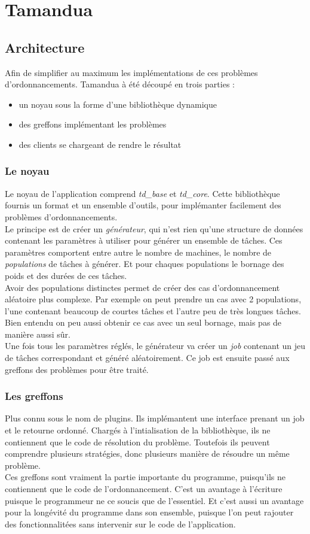 \chapter{Tamandua}
\section{Architecture}
Afin de simplifier au maximum les implémentations de ces problèmes 
d'ordonnancements. Tamandua à été découpé en trois parties :
\begin{itemize}
   \item un noyau sous la forme d'une bibliothèque dynamique
   \item des greffons implémentant les problèmes
   \item des clients se chargeant de rendre le résultat
\end{itemize}

\subsection{Le noyau}
Le noyau de l'application comprend {\em td\_base} et {\em td\_core}. Cette
bibliothèque fournis un format et un ensemble d'outils, pour implémanter
facilement des problèmes d'ordonnancements. \\
Le principe est de créer un {\em générateur}, qui n'est rien qu'une structure de
données contenant les paramètres à utiliser pour générer un ensemble de tâches.
Ces paramètres comportent entre autre le nombre de machines, le nombre de
{\em populations} de tâches à générer. Et pour chaques populations le bornage 
des poids et des durées de ces tâches.\\
Avoir des populations distinctes permet de créer des cas d'ordonnancement
aléatoire plus complexe. Par exemple on peut prendre un cas avec 2 populations, 
l'une contenant beaucoup de courtes tâches et l'autre peu de très longues 
tâches. Bien entendu on peu aussi obtenir ce cas avec un seul bornage, mais pas 
de manière aussi sûr.\\
Une fois tous les paramètres réglés, le générateur va créer un {\em job}
contenant un jeu de tâches correspondant et généré aléatoirement. Ce job est
ensuite passé aux greffons des problèmes pour être traité.

\subsection{Les greffons}
Plus connu sous le nom de plugins. Ils implémantent une interface prenant un job
et le retourne ordonné. Chargés à l'intialisation de la bibliothèque, ils
ne contiennent que le code de résolution du problème. Toutefois ils peuvent
comprendre plusieurs stratégies, donc plusieurs manière de résoudre un même
problème.\\
Ces greffons sont vraiment la partie importante du programme, puisqu'ils ne
contiennent que le code de l'ordonnancement. C'est un avantage à l'écriture
puisque le programmeur ne ce soucis que de l'essentiel. Et c'est aussi un
avantage pour la longévité du programme dans son ensemble, puisque l'on peut
rajouter des fonctionnalitées sans intervenir sur le code de l'application.

